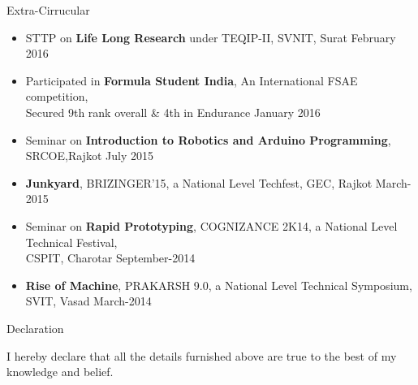 \documentclass{resume} %
\begin{document}
\begin{rSection}{Extra-Cirrucular} \itemsep -2pt   

\begin{itemize}
 
\item STTP on \textbf{Life Long Research} under TEQIP-II, SVNIT, Surat \hfill February 2016 
\item Participated in \textbf{Formula Student India}, An International FSAE competition,  
\\Secured 9th rank overall \& 4th in Endurance \hfill January 2016  
\item Seminar on \textbf{Introduction to Robotics and Arduino Programming}, SRCOE,Rajkot \hfill July 2015 
\item \textbf{Junkyard}, BRIZINGER'15, a National Level Techfest,  GEC, Rajkot \hfill March-2015
\item Seminar on \textbf{Rapid Prototyping}, COGNIZANCE 2K14, a National Level Technical Festival, \\CSPIT, Charotar  \hfill September-2014   
\item \textbf{Rise of Machine}, PRAKARSH 9.0, a National Level Technical Symposium, SVIT, Vasad \hfill March-2014  
  
\end{itemize}  


\end{rSection} 


\begin{rSection}{ Declaration  } \itemsep -3pt        

\item I hereby declare that all the details furnished above are true to the best of my knowledge and belief.   
  
\end{rSection}
\end{document}
